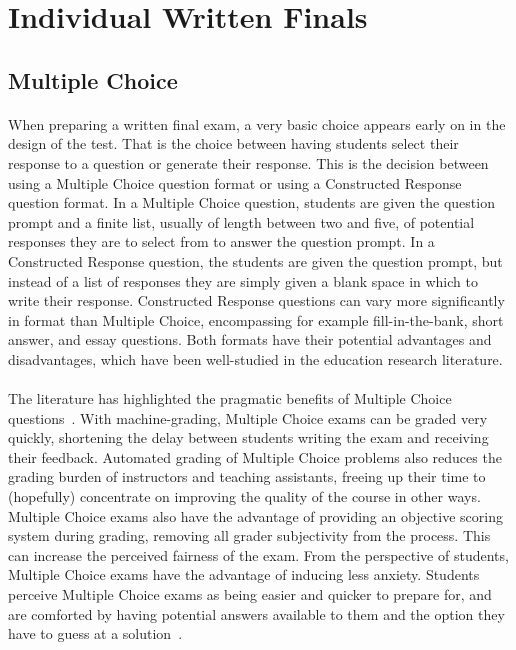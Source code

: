 \documentclass[12pt]{article}
\begin{document}
\section{Individual Written Finals}\label{sec:written}
\subsection{Multiple Choice}
\paragraph{}
When preparing a written final exam, a very basic choice appears early on in the design of the test. That is the choice between having students select their response to a question or generate their response. This is the decision between using a Multiple Choice question format or using a Constructed Response question format. In a Multiple Choice question, students are given the question prompt and a finite list, usually of length between two and five, of potential responses they are to select from to answer the question prompt. In a Constructed Response question, the students are given the question prompt, but instead of a list of responses they are simply given a blank space in which to write their response. Constructed Response questions can vary more significantly in format than Multiple Choice, encompassing for example fill-in-the-bank, short answer, and essay questions. Both formats have their potential advantages and disadvantages, which have been well-studied in the education research literature.
\paragraph{}
The literature has highlighted the pragmatic benefits of Multiple Choice questions~\cite{simkin2005multiple}. With machine-grading, Multiple Choice exams can be graded very quickly, shortening the delay between students writing the exam and receiving their feedback. Automated grading of Multiple Choice problems also reduces the grading burden of instructors and teaching assistants, freeing up their time to (hopefully) concentrate on improving the quality of the course in other ways. Multiple Choice exams also have the advantage of providing an objective scoring system during grading, removing all grader subjectivity from the process. This can increase the perceived fairness of the exam. From the perspective of students, Multiple Choice exams have the advantage of inducing less anxiety. Students perceive Multiple Choice exams as being easier and quicker to prepare for, and are comforted by having potential answers available to them and the option they have to guess at a solution~\cite{zeidner1987essay}.
\end{document}
